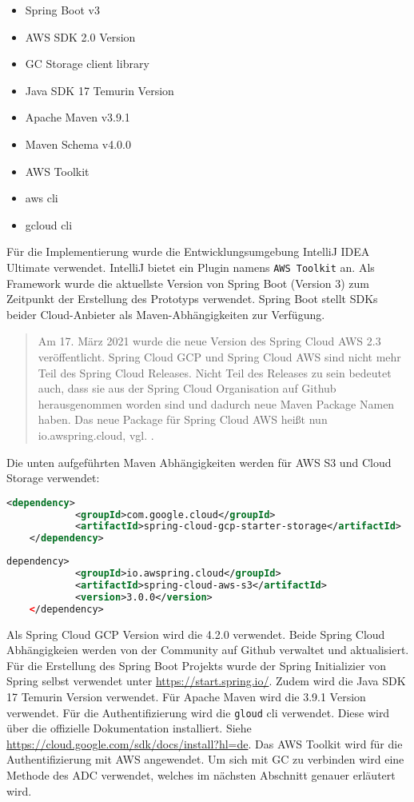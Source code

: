 \begin{itemize}
	\item Spring Boot v3
	\item AWS SDK 2.0 Version
	\item GC Storage client library
	\item Java SDK 17 Temurin Version
	\item Apache Maven v3.9.1
	\item Maven Schema v4.0.0
	\item AWS Toolkit
	\item aws cli
	\item gcloud cli
\end{itemize}

Für die Implementierung wurde die Entwicklungsumgebung IntelliJ IDEA Ultimate verwendet. IntelliJ bietet ein Plugin namens \verb|AWS Toolkit| an. Als Framework wurde die aktuellste Version von Spring Boot (Version 3) zum Zeitpunkt der Erstellung des Prototyps verwendet. Spring Boot stellt SDKs beider Cloud-Anbieter als Maven-Abhängigkeiten zur Verfügung.

\begin{quote}
	Am 17. März 2021 wurde die neue Version des Spring Cloud AWS 2.3 veröffentlicht. Spring Cloud GCP und Spring Cloud AWS sind nicht mehr Teil des Spring Cloud Releases. Nicht Teil des Releases zu sein bedeutet auch, dass sie aus der Spring Cloud Organisation auf Github herausgenommen worden sind und dadurch neue Maven Package Namen haben. Das neue Package für Spring Cloud AWS heißt nun \glqq io.awspring.cloud\grqq, vgl. \cite{spring-cloud-announce}. 
\end{quote}

Die unten aufgeführten Maven Abhängigkeiten werden für AWS S3 und Cloud Storage verwendet:

\begin{lstlisting}[language=XML]
	<dependency>
        	<groupId>com.google.cloud</groupId>
        	<artifactId>spring-cloud-gcp-starter-storage</artifactId>
    </dependency>
\end{lstlisting}

\begin{lstlisting}[language=XML]
	dependency>
        	<groupId>io.awspring.cloud</groupId>
        	<artifactId>spring-cloud-aws-s3</artifactId>
        	<version>3.0.0</version>
    </dependency>
\end{lstlisting}

Als Spring Cloud GCP Version wird die 4.2.0 verwendet. Beide Spring Cloud Abhängigkeien werden von der Community auf Github verwaltet und aktualisiert. Für die Erstellung des Spring Boot Projekts wurde der Spring Initializier von Spring selbst verwendet unter \url{https://start.spring.io/}. Zudem wird die Java SDK 17 Temurin Version verwendet. Für Apache Maven wird die 3.9.1 Version verwendet. Für die Authentifizierung wird die \verb|gloud| cli verwendet. Diese wird über die offizielle Dokumentation installiert. Siehe \url{https://cloud.google.com/sdk/docs/install?hl=de}. Das AWS Toolkit wird für die Authentifizierung mit AWS angewendet. Um sich mit GC zu verbinden wird eine Methode des ADC verwendet, welches im nächsten Abschnitt genauer erläutert wird.

